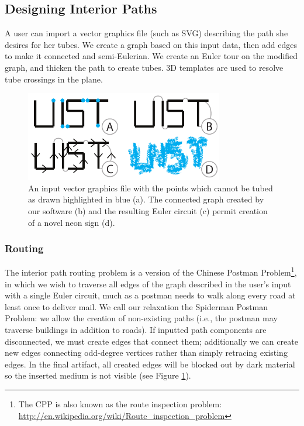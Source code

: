 \subsection{Designing Interior Paths}

A user can import a vector graphics file (such as SVG) describing the path she desires for her tubes.  We create a graph based on this input data, then add edges to make it connected and semi-Eulerian.  We create an Euler tour on the modified graph, and thicken the path to create tubes.  3D templates are used to resolve tube crossings in the plane.

\begin{figure}[h!]
\centering
    \includegraphics[width=3.4in]{figures/interior.pdf}
\caption{An input vector graphics file with the points which cannot be tubed as drawn highlighted in {\color{blue}blue} (a).  The connected graph created by our software (b) and the resulting Euler circuit (c) permit creation of a novel neon sign (d).}
\label{fig:tool-process-interior}
\end{figure}

\subsubsection{Routing}
The interior path routing problem is a version of the Chinese Postman Problem\footnote{The CPP is also known as the route inspection problem: \url{http://en.wikipedia.org/wiki/Route_inspection_problem}}, in which we wish to traverse all edges of the graph described in the user's input with a single Euler circuit, much as a postman needs to walk along every road at least once to deliver mail.  We call our relaxation the Spiderman Postman Problem: we allow the creation of non-existing paths (i.e., the postman may traverse buildings in addition to roads).  If inputted path components are disconnected, we must create edges that connect them; additionally we can create new edges connecting odd-degree vertices rather than simply retracing existing edges.  In the final artifact, all created edges will be blocked out by dark material so the inserted medium is not visible (see Figure \ref{fig:tool-process-interior}).


